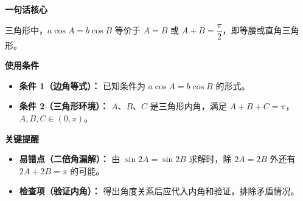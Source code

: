 \begin{summarybox}
	\textbf{\textcolor{CSummary}{一句话核心}}

	三角形中，$a\cos A = b\cos B$ 等价于 $A = B$ 或 $A + B = \dfrac{\pi}{2}$，即等腰或直角三角形。

	\medskip
	\textbf{\textcolor{CSummary}{使用条件}}
	\begin{itemize}[leftmargin=*, itemsep=0.5em, topsep=0.4em]
		\item \textbf{条件 1（边角等式）：} 已知条件为 $a\cos A = b\cos B$ 的形式。
		\item \textbf{条件 2（三角形环境）：} $A$、$B$、$C$ 是三角形内角，满足 $A+B+C=\pi$，$A,B,C\in(0,\pi)$。
	\end{itemize}

	\medskip
	\textbf{\textcolor{CSummary}{关键提醒}}
	\begin{itemize}[leftmargin=*, itemsep=0.5em, topsep=0.4em]
		\item \textbf{易错点（二倍角漏解）：} 由 $\sin 2A = \sin 2B$ 求解时，除 $2A=2B$ 外还有 $2A+2B=\pi$ 的可能。
		\item \textbf{检查项（验证内角）：} 得出角度关系后应代入内角和验证，排除矛盾情况。
	\end{itemize}
\end{summarybox}
